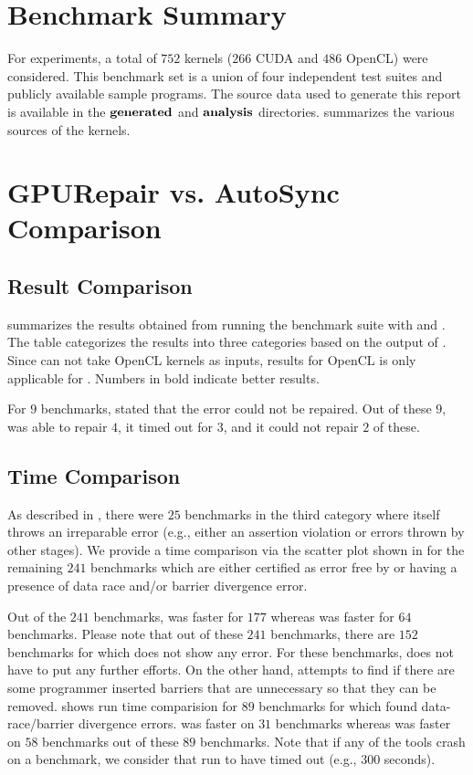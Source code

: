 \section{Benchmark Summary}
For experiments, a total of $752$ kernels ($266$ CUDA and $486$ OpenCL) were considered. This benchmark set is a union of four independent test suites and publicly available \cite{cudatoolkit} sample programs. The source data used to generate this report is available in the $\mathbf{generated}$ and $\mathbf{analysis}$ directories.  summarizes the various sources of the kernels.



\section{GPURepair vs. AutoSync Comparison}

\subsection{Result Comparison}
 summarizes the results obtained from running the benchmark suite with \tool and \autosync. The table categorizes the results into three categories based on the output of \verifier. Since \autosync can not take OpenCL kernels as inputs, results for OpenCL is only applicable for \tool. Numbers in bold indicate better results.

For $9$ benchmarks, \autosync stated that the error could not be repaired. Out of these $9$, \tool was able to repair $4$, it timed out for $3$, and it could not repair $2$ of these.



\subsection{Time Comparison}
As described in , there were $25$ benchmarks in the third category where \verifier itself throws an irreparable error (e.g., either an assertion violation or errors thrown by other stages). We provide a time comparison via the scatter plot shown in  for the remaining $241$ benchmarks which are either certified as error free by \verifier or having a presence of data race and/or barrier divergence error.

Out of the $241$ benchmarks, \autosync was faster for $177$ whereas \tool was faster for $64$ benchmarks. Please note that out of these $241$ benchmarks, there are $152$ benchmarks for which \verifier does not show any error. For these benchmarks, \autosync does not have to put any further efforts. On the other hand, \tool attempts to find if there are some programmer inserted barriers that are unnecessary so that they can be removed.  shows run time comparision for $89$ benchmarks for which \verifier found data-race/barrier divergence errors. \autosync was faster on $31$ benchmarks whereas \tool was faster on $58$ benchmarks out of these $89$ benchmarks. Note that if any of the tools crash on a benchmark, we consider that run to have timed out (e.g., $300$ seconds).

